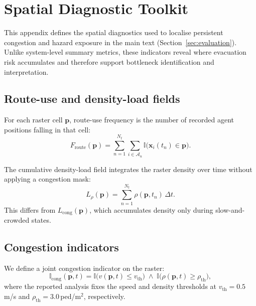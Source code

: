 \documentclass[preprint,12pt]{elsarticle}
\providecommand{\FloatBarrier}{}
\let\origsection\section
\renewcommand{\section}{\FloatBarrier\origsection}
\let\origsubsection\subsection
\renewcommand{\subsection}{\FloatBarrier\origsubsection}
\begin{document}
%
%

\section{Spatial Diagnostic Toolkit}
\label{sm:spatial_diagnostics}

This appendix defines the spatial diagnostics used to localise persistent
congestion and hazard exposure in the main text
(Section~\ref{sec:evaluation}). Unlike system-level summary metrics, these
indicators reveal where evacuation risk accumulates and therefore support
bottleneck identification and interpretation.

\subsection{Route-use and density-load fields}

For each raster cell $\mathbf{p}$, route-use frequency is the number of
recorded agent positions falling in that cell:
\begin{equation}
F_{\mathrm{route}}(\mathbf{p})
= \sum_{n=1}^{N_t}\sum_{i\in\mathcal{A}_n}
\mathbb{I}\!\big(\mathbf{x}_i(t_n)\in \mathbf{p}\big).
\end{equation}

The cumulative density-load field integrates the raster density over time
without applying a congestion mask:
\begin{equation}
L_{\rho}(\mathbf{p})
= \sum_{n=1}^{N_t} \rho(\mathbf{p},t_n)\,\Delta t .
\end{equation}
This differs from $L_{\mathrm{cong}}(\mathbf{p})$, which accumulates
density only during slow-and-crowded states.

\subsection{Congestion indicators}

We define a joint congestion indicator on the raster:
\begin{equation}
\mathbb{I}_{\mathrm{cong}}(\mathbf{p}, t)
= \mathbb{I}\!\big(v(\mathbf{p}, t) \leq v_{\mathrm{th}}\big)
  \;\wedge\;
  \mathbb{I}\!\big(\rho(\mathbf{p}, t) \geq \rho_{\mathrm{th}}\big),
\end{equation}
where the reported analysis fixes the speed and density thresholds at
$v_{\mathrm{th}} = 0.5$\,m/s and
$\rho_{\mathrm{th}} = 3.0$\,ped/m$^2$, respectively.
\end{document}
